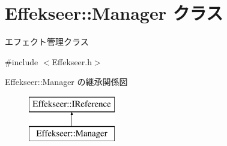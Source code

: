 \hypertarget{class_effekseer_1_1_manager}{}\section{Effekseer\+:\+:Manager クラス}
\label{class_effekseer_1_1_manager}


エフェクト管理クラス  




{\ttfamily \#include $<$Effekseer.\+h$>$}

Effekseer\+:\+:Manager の継承関係図\begin{figure}[H]
\begin{center}
\leavevmode
\includegraphics[height=2.000000cm]{class_effekseer_1_1_manager}
\end{center}
\end{figure}
